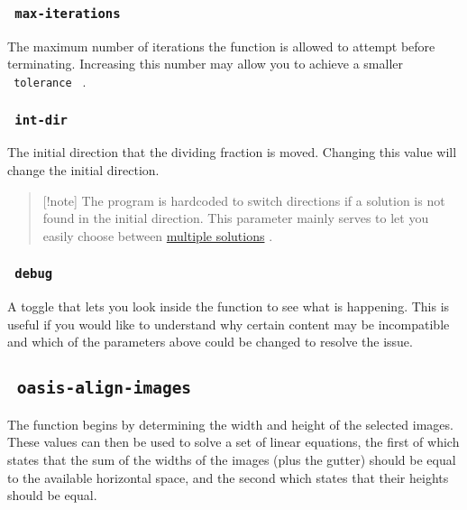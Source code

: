 \subsubsection{\texorpdfstring{\texttt{\ max-iterations\ }}{ max-iterations }}\label{max-iterations}

The maximum number of iterations the function is allowed to attempt
before terminating. Increasing this number may allow you to achieve a
smaller \texttt{\ tolerance\ } .

\subsubsection{\texorpdfstring{\texttt{\ int-dir\ }}{ int-dir }}\label{int-dir}

The initial direction that the dividing fraction is moved. Changing this
value will change the initial direction.

\begin{quote}
{[}!note{]} The program is hardcoded to switch directions if a solution
is not found in the initial direction. This parameter mainly serves to
let you easily choose between
\href{https://github.com/typst/packages/raw/main/packages/preview/oasis-align/0.1.0/\#oasis-align-2}{multiple
solutions} .
\end{quote}

\subsubsection{\texorpdfstring{\texttt{\ debug\ }}{ debug }}\label{debug}

A toggle that lets you look inside the function to see what is
happening. This is useful if you would like to understand why certain
content may be incompatible and which of the parameters above could be
changed to resolve the issue.

\subsection{\texorpdfstring{\texttt{\ oasis-align-images\ }}{ oasis-align-images }}\label{oasis-align-images-1}

The function begins by determining the width and height of the selected
images. These values can then be used to solve a set of linear
equations, the first of which states that the sum of the widths of the
images (plus the gutter) should be equal to the available horizontal
space, and the second which states that their heights should be equal.

